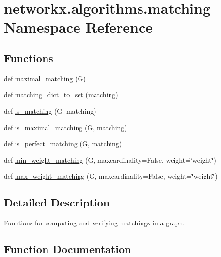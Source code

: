 \hypertarget{namespacenetworkx_1_1algorithms_1_1matching}{}\section{networkx.\+algorithms.\+matching Namespace Reference}
\label{namespacenetworkx_1_1algorithms_1_1matching}
\subsection*{Functions}
\begin{DoxyCompactItemize}
\item 
def \hyperlink{namespacenetworkx_1_1algorithms_1_1matching_aeaccb9ee6eef7c164ae2f45197694639}{maximal\+\_\+matching} (G)
\item 
def \hyperlink{namespacenetworkx_1_1algorithms_1_1matching_a4ae567c564e570b5119670f9b48aeac2}{matching\+\_\+dict\+\_\+to\+\_\+set} (matching)
\item 
def \hyperlink{namespacenetworkx_1_1algorithms_1_1matching_a700cc3b02f80c3a2800e2856ec4e34b4}{is\+\_\+matching} (G, matching)
\item 
def \hyperlink{namespacenetworkx_1_1algorithms_1_1matching_a707c39b9fcbcdc5edc4cab754afb134b}{is\+\_\+maximal\+\_\+matching} (G, matching)
\item 
def \hyperlink{namespacenetworkx_1_1algorithms_1_1matching_a95c6af7688e43ad4e935b4fa6291f4e5}{is\+\_\+perfect\+\_\+matching} (G, matching)
\item 
def \hyperlink{namespacenetworkx_1_1algorithms_1_1matching_aa5a195508672b45c70e8f70c7086657f}{min\+\_\+weight\+\_\+matching} (G, maxcardinality=False, weight=\char`\"{}weight\char`\"{})
\item 
def \hyperlink{namespacenetworkx_1_1algorithms_1_1matching_ae7d48a6d283dcd1068803cd7df79aea3}{max\+\_\+weight\+\_\+matching} (G, maxcardinality=False, weight=\char`\"{}weight\char`\"{})
\end{DoxyCompactItemize}


\subsection{Detailed Description}
\begin{DoxyVerb}Functions for computing and verifying matchings in a graph.\end{DoxyVerb}
 

\subsection{Function Documentation}
\mbox{\label{namespacenetworkx_1_1algorithms_1_1matching_a700cc3b02f80c3a2800e2856ec4e34b4}} 
